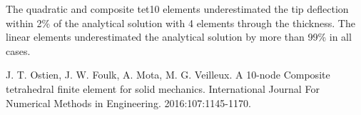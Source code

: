 \documentclass[a4paper, 12pt]{article}
\begin{document}
The quadratic and composite tet10 elements underestimated the tip deflection 
within 2\% of the analytical solution with 4 elements through
the thickness. 
The linear elements underestimated 
the analytical solution by more than 99\% in all cases.


\newpage
\begin{thebibliography}{99}

J. T. Ostien,
J. W. Foulk,
A. Mota,
M. G. Veilleux.
A 10-node Composite tetrahedral finite element for solid mechanics.
International Journal For Numerical Methods in Engineering.
2016:107:1145-1170. 

\end{thebibliography}
\end{document}
